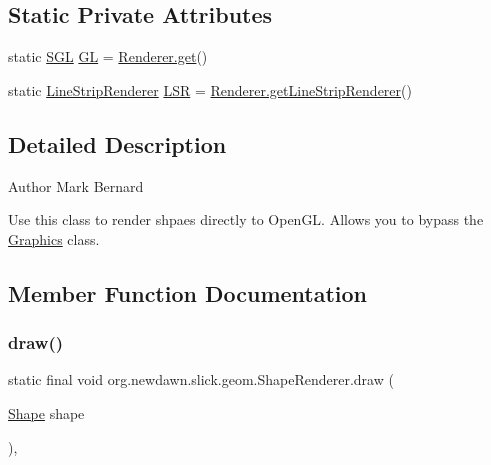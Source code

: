\subsection*{Static Private Attributes}
\begin{DoxyCompactItemize}
\item 
static \mbox{\hyperlink{interfaceorg_1_1newdawn_1_1slick_1_1opengl_1_1renderer_1_1_s_g_l}{S\+GL}} \mbox{\hyperlink{classorg_1_1newdawn_1_1slick_1_1geom_1_1_shape_renderer_a6116897ec2e7979b9ca9d406a4dfd566}{GL}} = \mbox{\hyperlink{classorg_1_1newdawn_1_1slick_1_1opengl_1_1renderer_1_1_renderer_abe742c3a7dfca67c6c01821d27087308}{Renderer.\+get}}()
\item 
static \mbox{\hyperlink{interfaceorg_1_1newdawn_1_1slick_1_1opengl_1_1renderer_1_1_line_strip_renderer}{Line\+Strip\+Renderer}} \mbox{\hyperlink{classorg_1_1newdawn_1_1slick_1_1geom_1_1_shape_renderer_a921cd2a9f7573ae41fa8b4830aa85c36}{L\+SR}} = \mbox{\hyperlink{classorg_1_1newdawn_1_1slick_1_1opengl_1_1renderer_1_1_renderer_a8e231c62dce8d884fd0b26beed63e743}{Renderer.\+get\+Line\+Strip\+Renderer}}()
\end{DoxyCompactItemize}


\subsection{Detailed Description}
\begin{DoxyAuthor}{Author}
Mark Bernard
\end{DoxyAuthor}
Use this class to render shpaes directly to Open\+GL. Allows you to bypass the \mbox{\hyperlink{classorg_1_1newdawn_1_1slick_1_1_graphics}{Graphics}} class. 

\subsection{Member Function Documentation}
\mbox{\label{classorg_1_1newdawn_1_1slick_1_1geom_1_1_shape_renderer_a631643ec8a7ae96aafd49f2056235b74}} 
\subsubsection{\texorpdfstring{draw()}{draw()}\hspace{0.1cm}{\footnotesize\ttfamily [1/2]}}
{\footnotesize\ttfamily static final void org.\+newdawn.\+slick.\+geom.\+Shape\+Renderer.\+draw (\begin{DoxyParamCaption}\item[{\mbox{\hyperlink{classorg_1_1newdawn_1_1slick_1_1geom_1_1_shape}{Shape}}}]{shape }\end{DoxyParamCaption})\hspace{0.3cm}{\ttfamily [inline]}, {\ttfamily [static]}}

